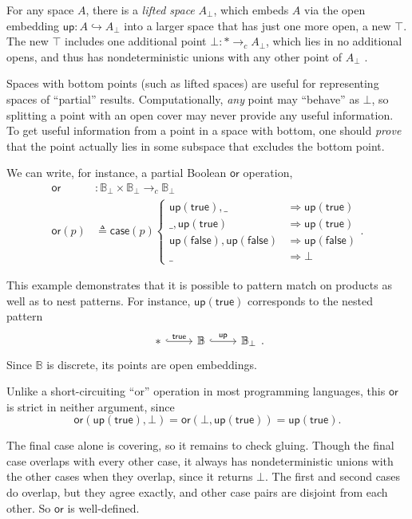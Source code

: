 \documentclass[conference]{IEEEtran}
\newcommand{\hookto}{\hookrightarrow}
\newcommand{\cto}{\to_c}
\newcommand{\One}{\ast}
\newcommand{\bool}{\mathbb{B}}
\newcommand{\wildcard}{\_}
\newcommand{\Branch}{\Rightarrow}
\newcommand{\up}{\mathsf{up}}
\newcommand{\btrue}{\mathsf{true}}
\newcommand{\bfalse}{\mathsf{false}}
\begin{document}
For any space $A$, there is a \emph{lifted space} $A_\bot$, which embeds $A$ via the open embedding $\up : A \hookto A_\bot$ into a larger space that has just one more open, a new $\top$. The new $\top$ includes one additional point $\bot : \One \cto A_\bot$, which lies in no additional opens, and thus has nondeterministic unions with any other point of $A_\bot$ \cite{topologyvialogic}.

Spaces with bottom points (such as lifted spaces) are useful for representing spaces of ``partial'' results. Computationally, \emph{any} point may ``behave'' as $\bot$, so splitting a point with an open cover may never provide any useful information. To get useful information from a point in a space with bottom, one should \emph{prove} that the point actually lies in some subspace that excludes the bottom point.

We can write, for instance, a partial Boolean $\mathsf{or}$ operation,
\begin{align*}
\mathsf{or} &: \bool_\bot \times \bool_\bot \cto \bool_\bot
\\ \mathsf{or}(p) &\triangleq \mathsf{case}(p)
\begin{cases}
\up(\btrue), \wildcard &\Branch \up(\btrue)
\\ \wildcard, \up(\btrue) &\Branch \up(\btrue)
\\ \up(\bfalse), \up(\bfalse) &\Branch \up(\bfalse)
\\ \wildcard &\Branch \bot
\end{cases}.
\end{align*}

This example demonstrates that it is possible to pattern match on products as well as to nest patterns. For instance, $\mathsf{up}(\mathsf{true})$ corresponds to the nested pattern
\begin{equation*}
\begin{tikzcd}
\One \arrow[r, hook, "\mathsf{true}"]
& \bool
   \arrow[r, hook, "\mathsf{up}"]
& \bool_\bot
\end{tikzcd}.
\end{equation*}
Since $\bool$ is discrete, its points are open embeddings.

Unlike a short-circuiting ``or'' operation in most programming languages, this $\mathsf{or}$ is strict in neither argument, since
\[ 
\mathsf{or}(\mathsf{up}(\mathsf{true}), \bot) = 
\mathsf{or}(\bot, \mathsf{up}(\mathsf{true})) =
\mathsf{up}(\mathsf{true}).
\]

The final case alone is covering, so it remains to check gluing. Though the final case overlaps with every other case, it always has nondeterministic unions with the other cases when they overlap, since it returns $\bot$. The first and second cases do overlap, but they agree exactly, and other case pairs are disjoint from each other. So $\mathsf{or}$ is well-defined.
\end{document}
